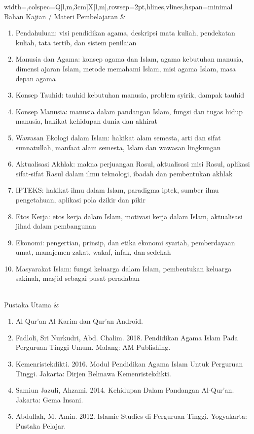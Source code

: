 \begin{longtblr}{width=\textwidth,colspec={Q[l,m,3cm]X[l,m]},rowsep=2pt,hlines,vlines,hspan=minimal}
Bahan Kajian / Materi Pembelajaran & \begin{enumerate}\item Pendahuluan: visi pendidikan agama, deskripsi mata kuliah, pendekatan kuliah, tata tertib, dan sistem penilaian\item Manusia dan Agama: konsep agama dan Islam, agama kebutuhan manusia, dimensi ajaran Islam, metode memahami Islam, misi agama Islam, masa depan agama\item Konsep Tauhid: tauhid kebutuhan manusia, problem syirik, dampak tauhid\item Konsep Manusia: manusia dalam pandangan Islam, fungsi dan tugas hidup manusia, hakikat kehidupan dunia dan akhirat\item Wawasan Ekologi dalam Islam: hakikat alam semesta, arti dan sifat sunnatullah, manfaat alam semesta, Islam dan wawasan lingkungan\item Aktualisasi Akhlak: makna perjuangan Rasul, aktualisasi misi Rasul, aplikasi sifat-sifat Rasul dalam ilmu teknologi, ibadah dan pembentukan akhlak\item IPTEKS: hakikat ilmu dalam Islam, paradigma iptek, sumber ilmu pengetahuan, aplikasi pola dzikir dan pikir\item Etos Kerja: etos kerja dalam Islam, motivasi kerja dalam Islam, aktualisasi jihad dalam pembangunan\item Ekonomi: pengertian, prinsip, dan etika ekonomi syariah, pemberdayaan umat, manajemen zakat, wakaf, infak, dan sedekah\item Masyarakat Islam: fungsi keluarga dalam Islam, pembentukan keluarga sakinah, masjid sebagai pusat peradaban\end{enumerate} \\
Pustaka Utama & \begin{enumerate}\item Al Qur'an Al Karim dan Qur'an Android.\item Fadloli, Sri Nurkudri, Abd. Chalim. 2018. Pendidikan Agama Islam Pada Perguruan Tinggi Umum. Malang: AM Publishing.\item Kemenristekdikti. 2016. Modul Pendidikan Agama Islam Untuk Perguruan Tinggi. Jakarta: Dirjen Belmawa Kemenristekdikti.\item Samiun Jazuli, Ahzami. 2014. Kehidupan Dalam Pandangan Al-Qur'an. Jakarta: Gema Insani.\item Abdullah, M. Amin. 2012. Islamic Studies di Perguruan Tinggi. Yogyakarta: Pustaka Pelajar.\end{enumerate} \\

\end{longtblr}
